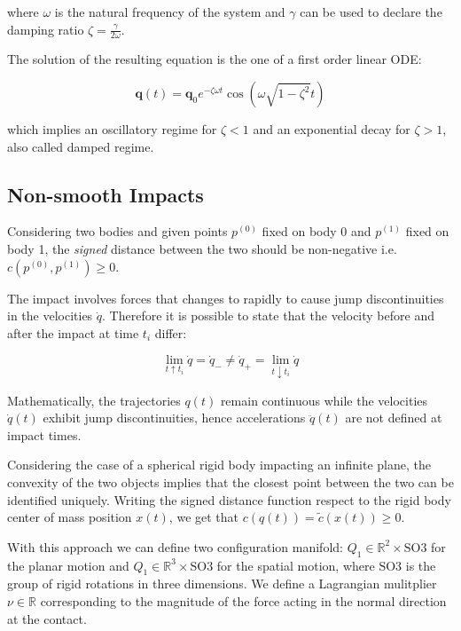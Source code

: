 where $\omega$ is the natural frequency of the system and $\gamma$ can be used to declare the damping ratio $\zeta = \frac{\gamma}{2\omega}$.

The solution of the resulting equation is the one of a first order linear \ac{ODE}:

\begin{equation}
    \mathbf{q}(t) = \mathbf{q}_0 e^{-\zeta \omega t} \cos(\omega \sqrt{1 - \zeta ^2} t)
\end{equation}

which implies an oscillatory regime for $\zeta < 1$ and an exponential decay for $\zeta > 1$, also called damped regime.

\subsection{Non-smooth Impacts}

Considering two bodies and given points $p ^{(0)}$ fixed on body 0 and $p ^{(1)}$ fixed on body 1, the \textit{signed} distance between the two should be non-negative i.e. $c(p ^{(0)}, p ^{(1)}) \geq 0$.

The impact involves forces that changes to rapidly to cause jump discontinuities in the velocities $\dot{q}$. Therefore it is possible to state that the velocity before and after the impact at time $t_i$ differ:

\begin{equation}
    \lim _{t \uparrow t _i} \dot{q} = \dot{q} _{-} \neq \dot{q} _{+} = \lim _{t \downarrow t _i} \dot{q}
\end{equation}

Mathematically, the trajectories $q(t)$ remain continuous while the velocities $\dot{q}(t)$ exhibit jump discontinuities, hence accelerations $\ddot{q}(t)$ are not defined at impact times.

Considering the case of a spherical rigid body impacting an infinite plane, the convexity of the two objects implies that the closest point between the two can be identified uniquely.
Writing the signed distance function respect to the rigid body center of mass position $x(t)$, we get that $c(q(t)) = \tilde{c}(x(t)) \geq 0$.

With this approach we can define two configuration manifold: $Q _1 \in \mathbb{R} ^2 \times \mathrm{SO}3$ for the planar motion and $Q _1 \in \mathbb{R} ^3 \times \mathrm{SO}3$ for the spatial motion, where $\mathrm{SO}3$ is the group of rigid rotations in three dimensions. We define a Lagrangian mulitplier $\nu \in \mathbb{R}$ corresponding to the magnitude of the force acting in the normal direction at the contact.

